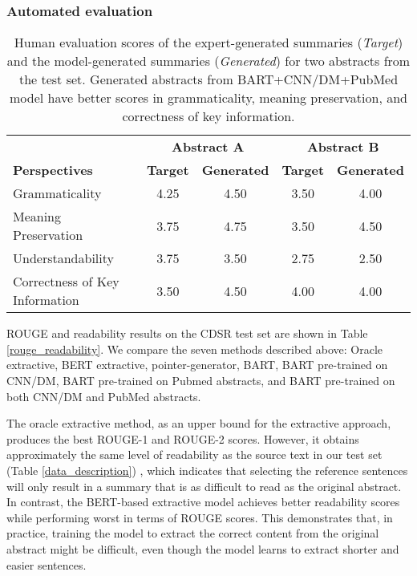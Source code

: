 \documentclass[letterpaper, table]{article}
\begin{document}
\subsubsection{Automated evaluation}



\begin{table*}
\centering
\begin{adjustbox}{width=0.13\columnwidth}
\begin{tabular}{@{} l cc cc @{}}
\toprule
& \multicolumn{2}{c}{\textbf{Abstract A}} & \multicolumn{2}{c}{\textbf{Abstract B}} \\
\cmidrule(lr){2-3}
\cmidrule(lr){4-5}
\textbf{Perspectives} & \textbf{Target}  & \textbf{Generated} & \textbf{Target}  & \textbf{Generated} \\
\midrule
Grammaticality            & 4.25    & 4.50        &3.50     & 4.00 \\
Meaning Preservation       & 3.75    & 4.75       & 3.50     & 4.50 \\
Understandability  & 3.75    & 3.50        & 2.75    & 2.50     \\
Correctness of Key Information        & 3.50     & 4.50    & 4.00       & 4.00 \\
\bottomrule
\end{tabular}
\end{adjustbox}
\caption{Human evaluation scores of the expert-generated summaries (\textit{Target}) and the model-generated summaries (\textit{Generated}) for two abstracts from the test set. Generated abstracts from BART+CNN/DM+PubMed model have better scores in grammaticality, meaning preservation, and correctness of key information.}
\label{result_human_evaluation}

\end{table*}
ROUGE and readability results on the CDSR test set are shown in Table \ref{rouge_readability}. We compare the seven methods described above: Oracle extractive, BERT extractive, pointer-generator, BART, BART pre-trained on CNN/DM, BART pre-trained on Pubmed abstracts, and BART pre-trained on both CNN/DM and PubMed abstracts.

The oracle extractive method, as an upper bound for the extractive approach, produces the best ROUGE-1 and ROUGE-2 scores. However, it obtains approximately the same level of readability as the source text in our test set (Table \ref{data_description})
, which indicates that selecting the reference sentences will only result in a summary that is as difficult to read as the original abstract.
In contrast, the BERT-based extractive model achieves better readability scores while performing worst in terms of ROUGE scores. This demonstrates that, in practice, training the model to extract the correct content from the original abstract might be difficult, even though the model learns to extract shorter and easier sentences.
\end{document}
